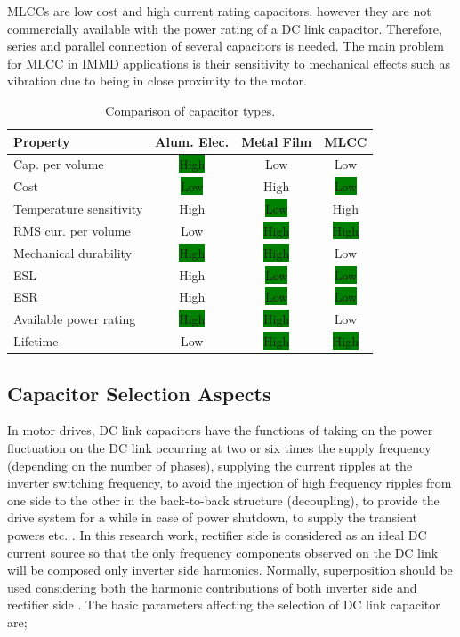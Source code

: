 \documentclass[conference,a4paper,twocolumn]{IEEEtran}
\begin{document}
MLCCs are low cost and high current rating capacitors, however they are not commercially available with the power rating of a DC link capacitor. Therefore, series and parallel connection of several capacitors is needed. The main problem for MLCC in IMMD applications is their sensitivity to mechanical effects such as vibration \cite{Brown2007} due to being in close proximity to the motor.



\begin{table}[h]
\renewcommand{\arraystretch}{1.4}
\caption{Comparison of capacitor types.}
\label{table1}
\centering
\begin{tabular}{lccc}
\hline
\textbf{Property} & \textbf{Alum. Elec.} & \textbf{Metal Film} & \textbf{MLCC}\\
\hline
Cap. per volume & \colorbox{green}{High} & Low & Low\\
\hline
Cost & \colorbox{green}{Low} & High & \colorbox{green}{Low}\\
\hline
Temperature sensitivity & High & \colorbox{green}{Low} & High\\
\hline
RMS cur. per volume & Low & \colorbox{green}{High} & \colorbox{green}{High}\\
\hline
Mechanical durability & \colorbox{green}{High} & \colorbox{green}{High} & Low\\
\hline
ESL & High & \colorbox{green}{Low} & \colorbox{green}{Low}\\
\hline
ESR & High & \colorbox{green}{Low} & \colorbox{green}{Low}\\
\hline
Available power rating & \colorbox{green}{High} & \colorbox{green}{High} & Low\\
\hline
Lifetime & Low & \colorbox{green}{High} & \colorbox{green}{High}\\
\hline
\end{tabular}
\end{table}


\subsection{Capacitor Selection Aspects}

In motor drives, DC link capacitors have the functions of taking on the power fluctuation on the DC link occurring at two or six times the supply frequency (depending on the number of phases), supplying the current ripples at the inverter switching frequency, to avoid the injection of high frequency ripples from one side to the other in the back-to-back structure (decoupling), to provide the drive system for a while in case of power shutdown, to supply the transient powers etc. \cite{Bianchi2003}. In this research work, rectifier side is considered as an ideal DC current source so that the only frequency components observed on the DC link will be composed only inverter side harmonics. Normally, superposition should be used considering both the harmonic contributions of both inverter side and rectifier side \cite{Bianchi2003}.
The basic parameters affecting the selection of DC link capacitor are;
\end{document}
